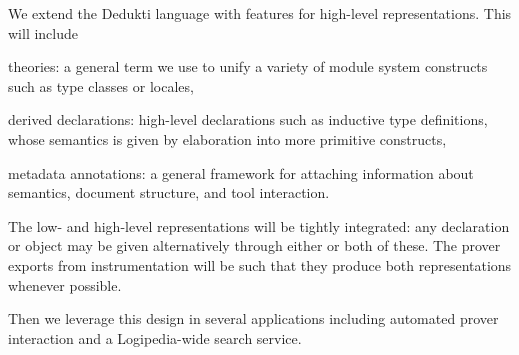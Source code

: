 \begin{workpackage}[id=structuring,wphases=0-48,type=RTD,
  short=Structured Theories and Metadata,%
  title=Structured Theories and Metadata,
  lead=Fau,
  BolRM=18,
  FauRM=48,
  SacRM=48]
\begin{wpdescription}
We extend the Dedukti language with features for high-level representations.
This will include
\begin{compactitem}
\item theories: a general term we use to unify a variety of module system constructs such as type classes or locales,
\item derived declarations: high-level declarations such as inductive type definitions, whose semantics is given by elaboration into more primitive constructs,
\item metadata annotations: a general framework for attaching information about semantics, document structure, and tool interaction.
\end{compactitem}

The low- and high-level representations will be tightly integrated: any declaration or object may be given alternatively through either or both of these.
The prover exports from instrumentation will be such that they produce both representations whenever possible.

Then we leverage this design in several applications including automated prover interaction and a Logipedia-wide search service.
\end{wpdescription}

\begin{tasklist}
\begin{task}[id=strlibstructure,title=Library Structure,lead=Fau,FauRM=5,SacRM=5]
\end{task} 

\begin{task}[id=strofimpl,title=Library Structure,lead=Fau,FauRM=5,SacRM=5]
\end{task} 

\begin{task}[id=strlibstructure,title=Ontological Framework for Meta-Data,lead=Fau,FauRM=5,SacRM=5]
\end{task} 

\begin{task}[id=strrefonto,title=Reference Ontologies,lead=Fau,FauRM=5,SacRM=5]
\end{task} 

\begin{task}[id=strontorepml,title=Meta-data Support for Major Libraries,lead=Fau,FauRM=5,SacRM=5]
\end{task} 

\begin{task}[id=strontosearch,title=Ontological Search,lead=Fau,FauRM=5,SacRM=5]
\end{task} 


\end{tasklist}
\end{workpackage}
